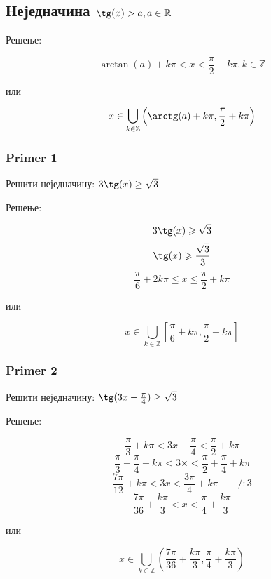 \documentclass[../diplomski.tex]{subfiles}
\begin{document}
\subsection{Неједначина $\tg(x)>a,a\in\mathbb{R}$}

Решење:



\[\arctan(a)+k\pi<x<\frac{\pi}{2}+k\pi,k\in\mathbb{Z}\]
\centerline{или}
\[x\in\bigcup_{k\in\mathbb{Z}}\left(\arctg(a)+k\pi,\frac{\pi}{2}+k\pi\right)\]

\subsubsection{Primer 1}

Решити неједначину: $3\tg(x)\ge\sqrt3$

Решење:



\[3\tg(x)\geqslant\sqrt{3}\]
\[\tg(x)\geqslant\frac{\sqrt{3}}{3}\]
\[\frac{\pi}{6}+2k\pi\leqslant x\leqslant\frac{\pi}{2}+k\pi\]
\centerline{или}
\[x\in\bigcup_{k\in\mathbb{Z}}\left[\frac{\pi}{6}+k\pi,\frac{\pi}{2}+k\pi\right]\]

\subsubsection{Primer 2}

Решити неједначину: $\tg(3x-\frac{\pi}{4})\ge\sqrt3$

Решење:



\[\frac{\pi}{3}+k\pi<3x-\frac{\pi}{4}<\frac{\pi}{2}+k\pi\]
\[\frac{\pi}{3}+\frac{\pi}{4}+k\pi<3\times<\frac{\pi}{2}+\frac{\pi}{4}+k\pi\]
\[\frac{7\pi}{12}+k\pi<3x<\frac{3\pi}{4}+k\pi\qquad/:3\]
\[\frac{7\pi}{36}+\frac{k\pi}{3}<x<\frac{\pi}{4}+\frac{k\pi}{3}\]
\centerline{или}
\[x\in\bigcup_{k\in\mathbb{Z}}\left(\frac{7\pi}{36}+\frac{k\pi}{3},\frac{\pi}{4}+\frac{k\pi}{3}\right)\]
\end{document}
